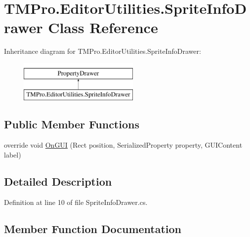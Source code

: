 \hypertarget{class_t_m_pro_1_1_editor_utilities_1_1_sprite_info_drawer}{}\section{T\+M\+Pro.\+Editor\+Utilities.\+Sprite\+Info\+Drawer Class Reference}
\label{class_t_m_pro_1_1_editor_utilities_1_1_sprite_info_drawer}
Inheritance diagram for T\+M\+Pro.\+Editor\+Utilities.\+Sprite\+Info\+Drawer\+:\begin{figure}[H]
\begin{center}
\leavevmode
\includegraphics[height=2.000000cm]{class_t_m_pro_1_1_editor_utilities_1_1_sprite_info_drawer}
\end{center}
\end{figure}
\subsection*{Public Member Functions}
\begin{DoxyCompactItemize}
\item 
override void \mbox{\hyperlink{class_t_m_pro_1_1_editor_utilities_1_1_sprite_info_drawer_abcdc90e14ded0295612a7d080733d00b}{On\+G\+UI}} (Rect position, Serialized\+Property property, G\+U\+I\+Content label)
\end{DoxyCompactItemize}


\subsection{Detailed Description}


Definition at line 10 of file Sprite\+Info\+Drawer.\+cs.



\subsection{Member Function Documentation}
\mbox{\label{class_t_m_pro_1_1_editor_utilities_1_1_sprite_info_drawer_abcdc90e14ded0295612a7d080733d00b}} 

